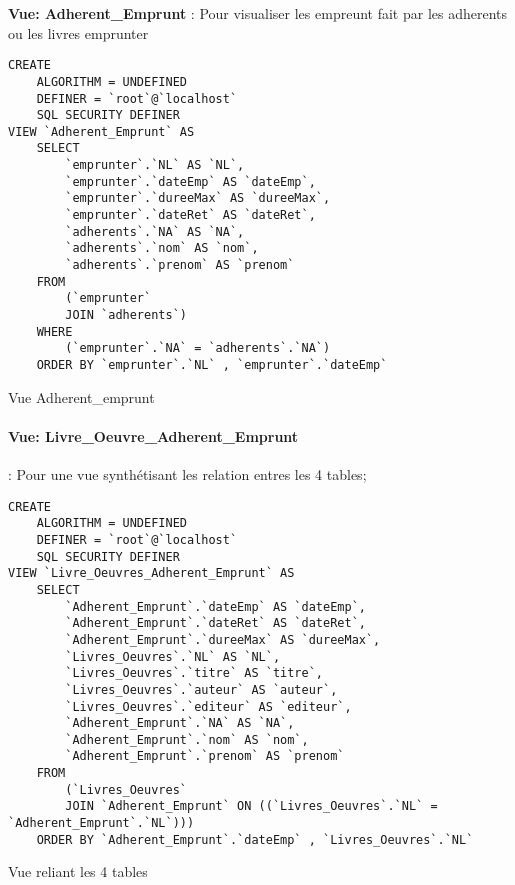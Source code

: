 \documentclass{article}
\begin{document}
\textbf{Vue: Adherent\_Emprunt} : Pour visualiser les empreunt fait par les adherents ou les livres emprunter
\begin{listing}[H]
\begin{verbatim}
CREATE 
    ALGORITHM = UNDEFINED 
    DEFINER = `root`@`localhost` 
    SQL SECURITY DEFINER
VIEW `Adherent_Emprunt` AS
    SELECT 
        `emprunter`.`NL` AS `NL`,
        `emprunter`.`dateEmp` AS `dateEmp`,
        `emprunter`.`dureeMax` AS `dureeMax`,
        `emprunter`.`dateRet` AS `dateRet`,
        `adherents`.`NA` AS `NA`,
        `adherents`.`nom` AS `nom`,
        `adherents`.`prenom` AS `prenom`
    FROM
        (`emprunter`
        JOIN `adherents`)
    WHERE
        (`emprunter`.`NA` = `adherents`.`NA`)
    ORDER BY `emprunter`.`NL` , `emprunter`.`dateEmp`
\end{verbatim}
	\caption{Vue Adherent\_emprunt}
\end{listing}

\newpage
\paragraph{Vue: Livre\_Oeuvre\_Adherent\_Emprunt }: Pour une vue synthétisant les relation entres les 4  tables;
\begin{listing}[H]
\begin{verbatim}
CREATE 
	ALGORITHM = UNDEFINED 
	DEFINER = `root`@`localhost` 
	SQL SECURITY DEFINER
VIEW `Livre_Oeuvres_Adherent_Emprunt` AS
	SELECT 
		`Adherent_Emprunt`.`dateEmp` AS `dateEmp`,
		`Adherent_Emprunt`.`dateRet` AS `dateRet`,
		`Adherent_Emprunt`.`dureeMax` AS `dureeMax`,
		`Livres_Oeuvres`.`NL` AS `NL`,
		`Livres_Oeuvres`.`titre` AS `titre`,
		`Livres_Oeuvres`.`auteur` AS `auteur`,
		`Livres_Oeuvres`.`editeur` AS `editeur`,
		`Adherent_Emprunt`.`NA` AS `NA`,
		`Adherent_Emprunt`.`nom` AS `nom`,
		`Adherent_Emprunt`.`prenom` AS `prenom`
	FROM
		(`Livres_Oeuvres`
		JOIN `Adherent_Emprunt` ON ((`Livres_Oeuvres`.`NL` = `Adherent_Emprunt`.`NL`)))
	ORDER BY `Adherent_Emprunt`.`dateEmp` , `Livres_Oeuvres`.`NL`
\end{verbatim}
	\caption{Vue reliant les 4 tables}
\end{listing}
\end{document}
